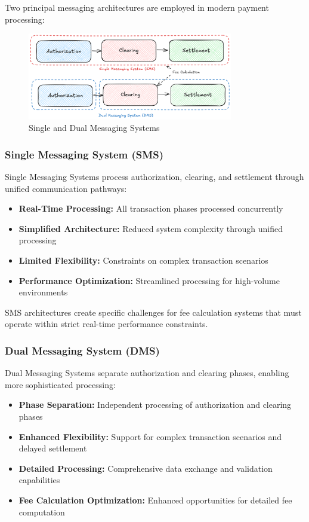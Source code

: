 Two principal messaging architectures are employed in modern payment processing:

\begin{figure}[H]
    \centering
    \includegraphics[width=0.8\textwidth]{img/Txn_SMS_DMS.png}
    \caption{Single and Dual Messaging Systems}
\end{figure}

\subsubsection{Single Messaging System (SMS)}

Single Messaging Systems process authorization, clearing, and settlement through unified communication pathways:

\begin{itemize}
   \item \textbf{Real-Time Processing:} All transaction phases processed concurrently
   \item \textbf{Simplified Architecture:} Reduced system complexity through unified processing
   \item \textbf{Limited Flexibility:} Constraints on complex transaction scenarios
   \item \textbf{Performance Optimization:} Streamlined processing for high-volume environments
\end{itemize}

SMS architectures create specific challenges for fee calculation systems that must operate within strict real-time performance constraints.

\subsubsection{Dual Messaging System (DMS)}

Dual Messaging Systems separate authorization and clearing phases, enabling more sophisticated processing:

\begin{itemize}
   \item \textbf{Phase Separation:} Independent processing of authorization and clearing phases
   \item \textbf{Enhanced Flexibility:} Support for complex transaction scenarios and delayed settlement
   \item \textbf{Detailed Processing:} Comprehensive data exchange and validation capabilities
   \item \textbf{Fee Calculation Optimization:} Enhanced opportunities for detailed fee computation
\end{itemize}


